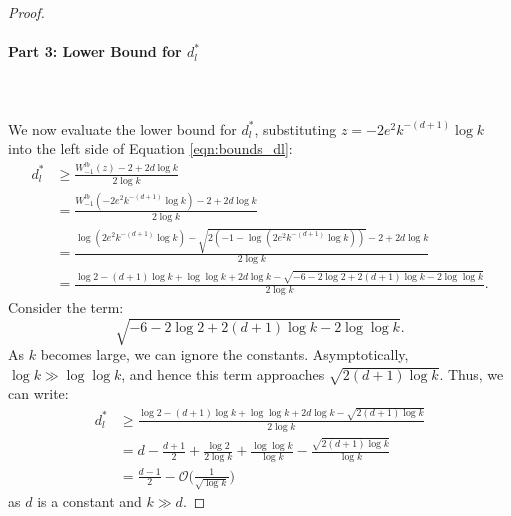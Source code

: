 \begin{proof}
\paragraph{Part 3: Lower Bound for $d^*_l$}\leavevmode\leavevmode\\\\
We now evaluate the lower bound for $d_l^*$, substituting $z=-2e^2k^{-(d+1)}\log k$ into the left side of Equation \ref{eqn:bounds_dl}:
\begin{align}
d^*_l &\geq \frac{W_{-1}^{lb}(z) - 2+2d\log k}{2\log k} \\
    &= \frac{W_{-1}^{lb}\left(-2e^2k^{-\left(d+1\right)}\log k\right) - 2+2d\log k}{2\log k} \\
    &= \frac{\log\left(2e^2k^{-\left(d+1\right)}\log k\right)-\sqrt{2\left(-1-\log\left(2e^2k^{-\left(d+1\right)}\log k\right)\right)}-2+2d\log k}{2\log k}\\
    &= \frac{\log 2 -(d+1)\log k + \log \log k + 2d\log k - \sqrt{-6-2\log 2 + 2(d+1)\log k - 2\log \log k}}{2\log k}.
\end{align}
Consider the term: 
\begin{equation}
\sqrt{-6-2\log 2+2(d+1)\log k - 2\log \log k}.
\end{equation}
As $k$ becomes large, we can ignore the constants. Asymptotically, $\log k \gg \log \log k$, and hence this term approaches $\sqrt{2(d+1)\log k}$. Thus, we can write:
\begin{align}
    d^*_l &\geq \frac{\log 2 -(d+1)\log k + \log \log k + 2d\log k - \sqrt{2(d+1) \log k}}{2\log k}\\
    &= d-\frac{d+1}{2} + \frac{\log 2}{2\log k} + \frac{\log\log k}{\log k} - \frac{\sqrt{2(d+1)\log k}}{\log k}\\
    &= \frac{d-1}{2} - \mathcal{O}\Big(\frac{1}{\sqrt{\log k}}\Big)
\end{align}
as $d$ is a constant and $k \gg d$.

\end{proof}
